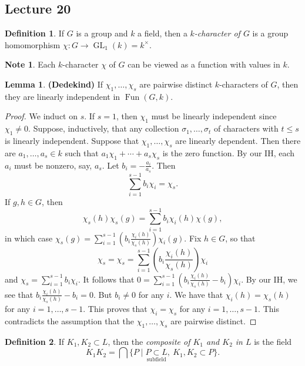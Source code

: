 \documentclass[10pt,letterpaper,cm]{nupset}
\theoremstyle{definition}
\newtheorem*{definition}{Definition}
\newtheorem{note}{Note}
\newtheorem{lemma}{Lemma}
\newcommand{\1}{\mathbf{1}}
\newcommand{\0}{\vec 0}
\DeclareMathOperator*{\GL}{GL}
\DeclareMathOperator{\Fun}{Fun}
\begin{document}
\subsection{Lecture 20}

\begin{definition}
If $G$ is a group and $k$ a field, then a \textit{$k$-character of $G$} is a group homomorphism $\chi : G \to \GL_1(k) =k^{\times}$.
\end{definition}

\begin{note}
Each $k$-character $\chi$ of $G$ can be viewed as a function with values in $k$.
\end{note}

\begin{lemma}{\textbf{(Dedekind)}}
If $\chi_1, \ldots, \chi_s$ are pairwise distinct $k$-characters of $G$, then they are linearly independent in $\Fun(G, k)$.
\end{lemma}
\begin{proof}
We induct on $s$. If $s=1$, then $\chi_1$ must be linearly independent since $\chi_1 \ne 0$. Suppose, inductively, that any collection $\sigma_1, \ldots, \sigma_t$ of characters with $t\leq s$ is linearly independent. Suppose that $\chi_1, \ldots, \chi_s$ are linearly dependent. Then there are $a_1, \ldots, a_s\in k$ such that $a_1\chi_1 + \cdots + a_s\chi_s$ is the zero function. By our IH, each $a_i$ must be nonzero, say, $a_s$. Let $b_i = {-}\frac{a_i}{a_s}$. Then $$\sum_{i=1}^{s-1} b_i\chi_i  = \chi_s.$$  If $g,h \in G$, then $$  \chi_s(h)\chi_s(g) = \sum_{i=1}^{s-1} b_i\chi_i(h)\chi(g)   ,$$ in which case $\chi_s(g)  = \sum_{i=1}^{s-1} (b_i \frac{\chi_i(h)}{\chi_s(h)})\chi_i(g) .$ Fix $h\in G$, so that $$\chi_s = \chi_s  = \sum_{i=1}^{s-1} (b_i \frac{\chi_i(h)}{\chi_s(h)})\chi_i $$ and $\chi_s = \sum_{i=1}^{s-1} b_i \chi_i$. It follows that $0 =   \sum_{i=1}^{s-1} (b_i \frac{\chi_i(h)}{\chi_s(h)} -b_i)\chi_i$. By our IH, we see that $b_i \frac{\chi_i(h)}{\chi_s(h)} - b_i =0$. But $b_i \ne 0$ for any $i$. We have that $\chi_i(h) = \chi_s(h)$ for any $i=1, \ldots, s-1$. This proves that $\chi_i = \chi_s$ for any $i=1, \ldots, s-1$. This contradicts the assumption that the $\chi_1, \ldots, \chi_s$ are pairwise distinct. 
\end{proof}

\begin{definition}
If $K_1, K_2 \subset L$, then the \textit{composite of $K_1$ and $K_2$ in $L$} is the field  $$ K_1K_2 = \bigcap \{P \mid  \underset{\text{subfield}}{P\subset L}, \ K_1, K_2 \subset P\}  .$$ 
\end{definition}
\end{document}
